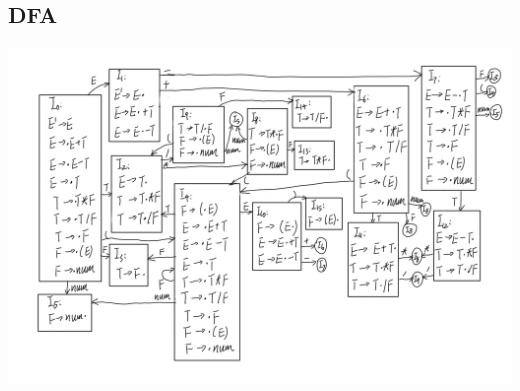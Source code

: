 \documentclass[UTF8]{ctexart}
\begin{document}
\subsection{DFA}
\includegraphics[width=\textwidth]{DFA}
\end{document}
